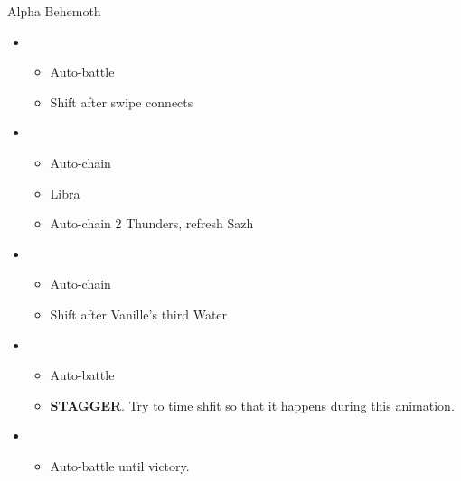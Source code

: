 	\vfill
	

	\begin{battle}[0:40]{Alpha Behemoth}
		\begin{itemize}
			\item \first
			      \begin{itemize}
				      \item Auto-battle
				      \item Shift after swipe connects
			      \end{itemize}
			\item \second
			      \begin{itemize}
				      \item Auto-chain
				      \item Libra
				      \item Auto-chain 2 Thunders, refresh Sazh
			      \end{itemize}
			\item \fourth
			      \begin{itemize}
				      \item Auto-chain
				      \item Shift after Vanille's third Water
			      \end{itemize}
			\item \first
			      \begin{itemize}
				      \item Auto-battle
				      \item \textbf{STAGGER}. Try to time shfit so that it happens during this animation.
			      \end{itemize}
			\item \third
			      \begin{itemize}
				      \item Auto-battle until victory.
			      \end{itemize}
		\end{itemize}
	\end{battle}
	\vfill
	\ 


	

